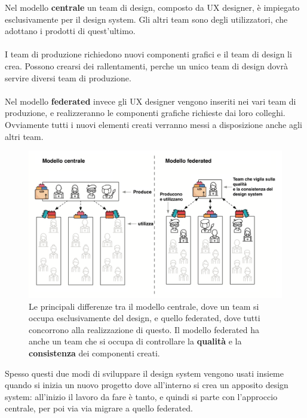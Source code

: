 Nel modello \textbf{centrale} un team di design, composto da UX designer, è impiegato esclusivamente per il design system. Gli altri team sono degli utilizzatori, che adottano i
 prodotti di quest'ultimo.
\\\\
I team di produzione richiedono nuovi componenti grafici e il team di design li crea. 
Possono crearsi dei rallentamenti, perche un unico team di design dovrà servire diversi team di produzione.
\\\\
Nel modello \textbf{federated} invece gli UX designer vengono inseriti nei vari team di produzione, e realizzeranno le componenti grafiche richieste dai loro colleghi. 
Ovviamente tutti i nuovi elementi creati verranno messi a disposizione anche agli altri team.
\begin{figure}[H]
    \centering
    \includegraphics[width=148mm]{img/design system}
    \caption{Le principali differenze tra il modello centrale, dove un team si occupa esclusivamente del design, e
    quello federated, dove tutti concorrono alla realizzazione di questo. Il modello federated ha anche un team che si occupa di controllare la \textbf{qualità} e la 
    \textbf{consistenza} dei componenti creati.}
  \end{figure}

Spesso questi due modi di sviluppare il design system vengono usati insieme quando si inizia un nuovo progetto dove 
all'interno si crea un apposito design system: all’inizio il lavoro da fare
 è tanto, e quindi si parte con l’approccio centrale, per poi via via migrare a quello federated.